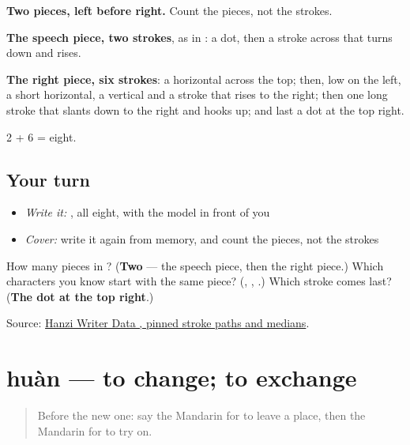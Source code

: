 \begin{quote}
\end{quote}

\textbf{Two pieces, left before right.} Count the pieces, not the strokes.

\textbf{The speech piece, two strokes}, as in : a dot, then a stroke across that turns down and rises.

\textbf{The right piece, six strokes}: a horizontal across the top; then, low on the left, a short horizontal, a vertical and a stroke that rises to the right; then one long stroke that slants down to the right and hooks up; and last a dot at the top right.

2 + 6 = eight.

\subsection*{Your turn}
\begin{itemize}
\raggedright
  \item \emph{Write it:} , all eight, with the model in front of you
  \item \emph{Cover:} write it again from memory, and count the pieces, not the strokes
\end{itemize}

\begin{tcolorbox}[breakable,colback=teal!4,colframe=teal!35!black,title={Before you move on}]
How many pieces in ? (\textbf{Two} — the speech piece, then the right piece.) Which characters you know start with the same piece? (\textbf{}, \textbf{}, \textbf{}.) Which stroke comes last? (\textbf{The dot at the top right}.)

Source: \href{https://raw.githubusercontent.com/chanind/hanzi-writer-data/68d10a4b21150cae5e1ebbd223eed289cf32d90c/data/\%E8\%AF\%95.json}{Hanzi Writer Data , pinned stroke paths and medians}.
\end{tcolorbox}
\section[huàn]{huàn — to change; to exchange}

\label{lesson:ZH-C108-huan-change}



\begin{quote}
Before the new one: say the Mandarin for to leave a place, then the Mandarin for to try on.
\end{quote}

